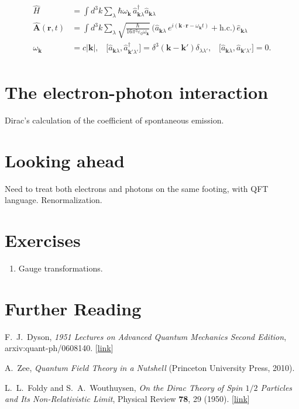 \documentclass[pra,12pt]{revtex4}
\begin{document}
\begin{align}
\boxed{\qquad
  \begin{aligned}
    \hat{H} &= \int d^3k\sum_{\lambda} \hbar \omega_{\mathbf{k}} \,
    \hat{a}^\dagger_{\mathbf{k}\lambda} \hat{a}_{\mathbf{k}\lambda} \\
  \hat{\mathbf{A}}(\mathbf{r},t) &= \int d^3k \sum_{\lambda} 
  \sqrt{\frac{\hbar}{16\pi^3\varepsilon_0\omega_{\mathbf{k}}}}\,
  \Big(\hat{a}_{\mathbf{k}\lambda} \, e^{i(\mathbf{k}\cdot\mathbf{r} - \omega_{\mathbf{k}} t)}
  + \mathrm{h.c.}\Big)\, \hat{e}_{\mathbf{k}\lambda} \\
  \omega_{\mathbf{k}} &= c|\mathbf{k}|,  \;\;\;
  \big[\hat{a}_{\mathbf{k}\lambda}, \hat{a}_{\mathbf{k}'\lambda'}^\dagger\big]
  = \delta^3(\mathbf{k}-\mathbf{k}') \delta_{\lambda\lambda'}, \;\;\;
  \big[\hat{a}_{\mathbf{k}\lambda}, \hat{a}_{\mathbf{k}'\lambda'}\big]
  = 0.
  \end{aligned}
  \qquad}
  \label{qed2}
\end{align}

\section{The electron-photon interaction}

Dirac's calculation of the coefficient of spontaneous emission.

\section{Looking ahead}

Need to treat both electrons and photons on the same footing, with QFT
language.  Renormalization.

\section*{Exercises}

\begin{enumerate}
\item Gauge transformations.
\end{enumerate}

\section*{Further Reading}

\begin{enumerate}[[1{]}]
\item F.~J.~Dyson, \textit{1951 Lectures on Advanced Quantum Mechanics
  Second Edition}, arxiv:quant-ph/0608140. [\href{https://arxiv.org/abs/quant-ph/0608140}{link}]
\label{cite:dyson}

\item A.~Zee, \textit{Quantum Field Theory in a Nutshell} (Princeton
  University Press, 2010).
\label{cite:zee}

\item L.~L.~Foldy and S.~A.~Wouthuysen, \textit{On the Dirac Theory of
  Spin $1/2$ Particles and Its Non-Relativistic Limit}, Physical
  Review \textbf{78}, 29 (1950). [\href{https://journals.aps.org/pr/abstract/10.1103/PhysRev.78.29}{link}]
\label{cite:foldy}
\end{enumerate}
\end{document}

